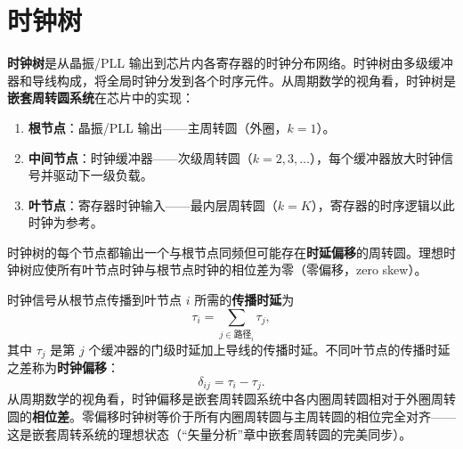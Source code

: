 \section{时钟树}

\begin{definition}[时钟树]\label{def:clock_tree}
\textbf{时钟树}是从晶振/PLL 输出到芯片内各寄存器的时钟分布网络。时钟树由多级缓冲器和导线构成，将全局时钟分发到各个时序元件。从周期数学的视角看，时钟树是\textbf{嵌套周转圆系统}在芯片中的实现：
\begin{enumerate}[label=(\roman*)]
    \item \textbf{根节点}：晶振/PLL 输出——主周转圆（外圈，$k=1$）。
    \item \textbf{中间节点}：时钟缓冲器——次级周转圆（$k=2, 3, \dots$），每个缓冲器放大时钟信号并驱动下一级负载。
    \item \textbf{叶节点}：寄存器时钟输入——最内层周转圆（$k=K$），寄存器的时序逻辑以此时钟为参考。
\end{enumerate}
时钟树的每个节点都输出一个与根节点同频但可能存在\textbf{时延偏移}的周转圆。理想时钟树应使所有叶节点时钟与根节点时钟的相位差为零（零偏移，zero skew）。
\end{definition}

\begin{definition}[时钟树时延与时钟偏移]\label{def:clock_skew}
时钟信号从根节点传播到叶节点 $i$ 所需的\textbf{传播时延}为
\[
\tau_i = \sum_{j \in \text{路径}_i} \tau_j,
\]
其中 $\tau_j$ 是第 $j$ 个缓冲器的门级时延加上导线的传播时延。不同叶节点的传播时延之差称为\textbf{时钟偏移}：
\[
\delta_{ij} = \tau_i - \tau_j.
\]
从周期数学的视角看，时钟偏移是嵌套周转圆系统中各内圈周转圆相对于外圈周转圆的\textbf{相位差}。零偏移时钟树等价于所有内圈周转圆与主周转圆的相位完全对齐——这是嵌套周转系统的理想状态（“矢量分析”章中嵌套周转圆的完美同步）。
\end{definition}

